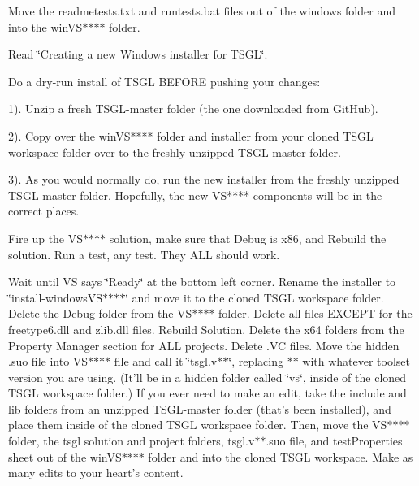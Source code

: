 Move the readmetests.\-txt and runtests.\-bat files out of the windows folder and into the win\-V\-S$\ast$$\ast$$\ast$$\ast$ folder.

Read \char`\"{}\-Creating a new Windows installer for T\-S\-G\-L\char`\"{}.

Do a dry-\/run install of T\-S\-G\-L B\-E\-F\-O\-R\-E pushing your changes\-: \begin{DoxyVerb}1). Unzip a fresh TSGL-master folder (the one downloaded from GitHub).

2). Copy over the winVS**** folder and installer from your cloned TSGL workspace folder over to the freshly unzipped TSGL-master folder.

3). As you would normally do, run the new installer from the freshly unzipped TSGL-master folder. Hopefully, the new VS**** components will be in the correct places. 
\end{DoxyVerb}


Fire up the V\-S$\ast$$\ast$$\ast$$\ast$ solution, make sure that Debug is x86, and Rebuild the solution. Run a test, any test. They A\-L\-L should work.

Wait until V\-S says \char`\"{}\-Ready\char`\"{} at the bottom left corner. Rename the installer to \char`\"{}install-\/windows\-V\-S$\ast$$\ast$$\ast$$\ast$\char`\"{} and move it to the cloned T\-S\-G\-L workspace folder. Delete the Debug folder from the V\-S$\ast$$\ast$$\ast$$\ast$ folder. Delete all files E\-X\-C\-E\-P\-T for the freetype6.\-dll and zlib.\-dll files. Rebuild Solution. Delete the x64 folders from the Property Manager section for A\-L\-L projects. Delete .V\-C files. Move the hidden .suo file into V\-S$\ast$$\ast$$\ast$$\ast$ file and call it \char`\"{}tsgl.\-v$\ast$$\ast$\char`\"{}, replacing $\ast$$\ast$ with whatever toolset version you are using. (It'll be in a hidden folder called \char`\"{}vs\char`\"{}, inside of the cloned T\-S\-G\-L workspace folder.) If you ever need to make an edit, take the include and lib folders from an unzipped T\-S\-G\-L-\/master folder (that's been installed), and place them inside of the cloned T\-S\-G\-L workspace folder. Then, move the V\-S$\ast$$\ast$$\ast$$\ast$ folder, the tsgl solution and project folders, tsgl.\-v$\ast$$\ast$.suo file, and test\-Properties sheet out of the win\-V\-S$\ast$$\ast$$\ast$$\ast$ folder and into the cloned T\-S\-G\-L workspace. Make as many edits to your heart's content. 
